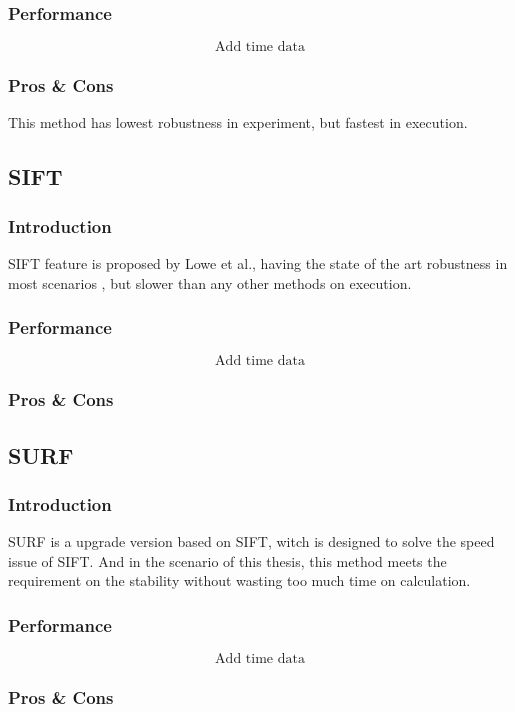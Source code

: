 		\subsubsection{Performance}
			$$\textrm{Add time data}$$
		\subsubsection{Pros \& Cons}
			This method has lowest robustness in experiment, but fastest in execution.

	\subsection{SIFT}
		\subsubsection{Introduction}
		SIFT feature is proposed by Lowe \cite{lowe2004distinctive} et al., having the state of the art robustness in most scenarios \cite{karami2017image}, but slower than any other methods on execution.
		\subsubsection{Performance}
			$$\textrm{Add time data}$$
		\subsubsection{Pros \& Cons}
	
	\subsection{SURF}
		\subsubsection{Introduction}
		SURF is a upgrade version based on SIFT, witch is designed to solve the speed issue of SIFT. 
		And in the scenario of this thesis, this method meets the requirement on the stability without wasting too much time on calculation.
		\subsubsection{Performance}
			$$\textrm{Add time data}$$
		\subsubsection{Pros \& Cons}

